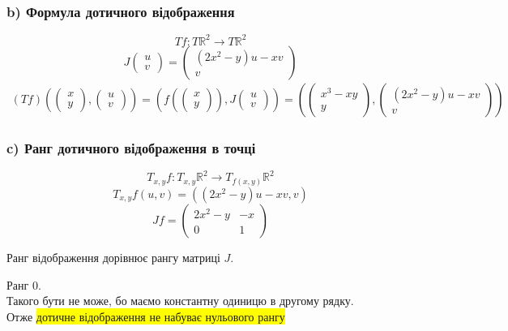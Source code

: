 \documentclass[10pt, a4paper]{article} %
\newcommand{\R}{\mathbb{R}}
\begin{document}
\subsubsection*{b) Формула дотичного відображення}
\[Tf : T\R^2 \to T\R^2\]
\[J\begin{pmatrix}u\\v\end{pmatrix} = \begin{pmatrix}(2x^2-y)u-xv\\v\end{pmatrix}\]
\begin{align*}
    (Tf)\left(\begin{pmatrix}x\\y\end{pmatrix} , \begin{pmatrix}u\\v\end{pmatrix}\right)
    = \left(f(\begin{pmatrix}x\\y\end{pmatrix}) , J\begin{pmatrix}u\\v\end{pmatrix}\right)
    = \left(\begin{pmatrix}x^3-xy \\ y\end{pmatrix} , \begin{pmatrix}(2x^2-y)u-xv\\v\end{pmatrix}\right)
\end{align*}

\subsubsection*{c) Ранг дотичного відображення в точці}
\[T_{x,y}f : T_{x,y}\R^2 \to T_{f(x,y)}\R^2\]
\[T_{x,y}f(u,v) = ((2x^2-y)u-xv, v)\]
\[Jf = \begin{pmatrix}
    2x^2-y & -x\\
        0 & 1
\end{pmatrix}\]

Ранг відображення дорівнює рангу матриці $J$. 

Ранг 0.\\
Такого бути не може, бо маємо константну одиницю в другому рядку. \\
Отже \colorbox{yellow}{дотичне відображення не набуває нульового рангу}
\end{document}
